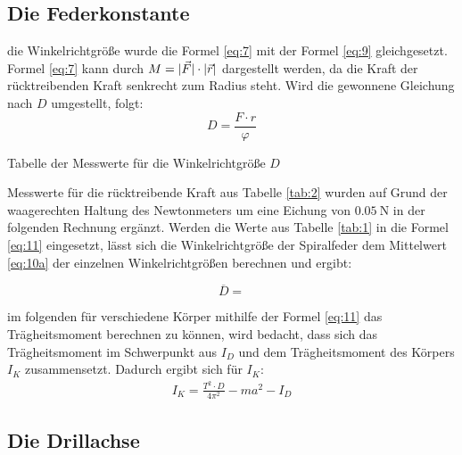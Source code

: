 
\subsection{Die Federkonstante}

\justifying die Winkelrichtgröße wurde die Formel \eqref{eq:7} mit der Formel \eqref{eq:9} gleichgesetzt. Formel \eqref{eq:7} kann durch $M = \lvert\vec{F}\rvert \cdot \lvert\vec{r}\rvert$
dargestellt werden, da die Kraft der rücktreibenden Kraft senkrecht zum Radius steht. Wird die gewonnene Gleichung nach $D$ umgestellt, folgt:
\begin{equation}
D = \frac{F\cdot r}{\varphi}\label{eq:11}
\end{equation}

\begin{table}[H]
    \centering
    
    \caption{Tabelle der Messwerte für die Winkelrichtgröße $D$}
    \label{tab:2}
\end{table}

\justifying Messwerte für die rücktreibende Kraft aus Tabelle \ref{tab:2} wurden auf Grund der waagerechten Haltung des Newtonmeters
um eine Eichung von $\SI{0.05}{\newton}$ in der folgenden Rechnung ergänzt.
Werden die Werte aus Tabelle \ref{tab:1} in die Formel \eqref{eq:11} eingesetzt, 
lässt sich die Winkelrichtgröße der Spiralfeder dem Mittelwert \eqref{eq:10a} der einzelnen Winkelrichtgrößen berechnen
und ergibt:

\begin{equation}
\overline{D} = \text{} \label{eq:12} %
\end{equation}

 im folgenden für verschiedene Körper mithilfe der Formel \eqref{eq:11} das Trägheitsmoment
berechnen zu können, wird bedacht, dass sich das Trägheitsmoment im Schwerpunkt 
aus $I_D$ und dem Trägheitsmoment des Körpers $I_K$ zusammensetzt. Dadurch ergibt sich 
für $I_K$:
\begin{align}
    I_K = \frac{T^2 \cdot D}{4 \pi^2}-ma^2-I_D\label{eq:13}
\end{align}

\subsection{Die Drillachse}\justifying %

